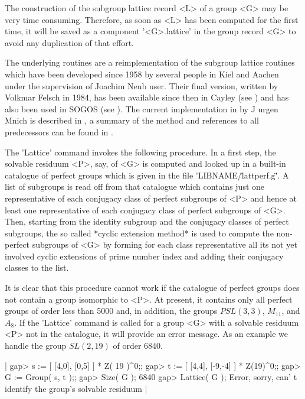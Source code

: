 The construction of the subgroup lattice record <L> of a group <G> may be
very time consuming. Therefore, as soon  as <L> has been computed for the
first  time, it will be  saved as a component '<G>.lattice' in the  group
record <G> to avoid any duplication of that effort.

The  underlying routines are a reimplementation  of the  subgroup lattice
routines which have been developed since 1958 by several  people  in Kiel
and Aachen under the supervision of Joachim  Neub{ u}ser. Their
final  version, written  by Volkmar Felsch in  1984, has  been  available
since  then in Cayley (see  \cite{BC92}) and  has also been used in SOGOS
(see \cite{Sog89}). The current implementation in {\GAP} by  J{
u}rgen Mnich is  described in \cite{Mni92}, a summary  of  the method and
references to all predecessors can be found in \cite{FS84}.

The 'Lattice'  command invokes the following procedure. In a  first step,
the solvable re\-si\-du\-um <P>, say, of <G> is computed and looked up in
a  built-in  catalogue  of perfect  groups  which  is  given in the  file
'LIBNAME/\"lattperf.g\"'.  A list of  subgroups is  read  off  from  that
catalogue which contains just one representative of  each conjugacy class
of perfect subgroups of <P> and hence at least one representative of each
conjugacy  class  of perfect  subgroups of  <G>. Then, starting from  the
identity subgroup and the conjugacy  classes of perfect subgroups, the so
called  *cyclic extension  method* is used  to  compute  the  non-perfect
subgroups of <G> by forming for each class representative all its not yet
involved  cyclic  extensions  of  prime  number  index and  adding  their
conjugacy classes to the list.

It is clear that this procedure cannot work  if the  catalogue of perfect
groups  does  not  contain  a  group  isomorphic to  <P>. At  present, it
contains  only all  perfect  groups  of  order less  than  5000  and,  in
addition, the  groups $PSL(3,3)$,  $M_{11}$, and $A_8$. If  the 'Lattice'
command is called for a group <G> with a solvable residuum <P> not in the
catalogue, it will provide an  error message. As an example we handle the
group $SL(2,19)$ of order 6840.

|    gap> s := [ [4,0], [0,5] ] * Z( 19 )^0;;
    gap> t := [ [4,4], [-9,-4] ] * Z(19)^0;;
    gap> G := Group( s, t );;
    gap> Size( G );
    6840
    gap> Lattice( G );
    Error, sorry, can' t identify the group's solvable residuum |

